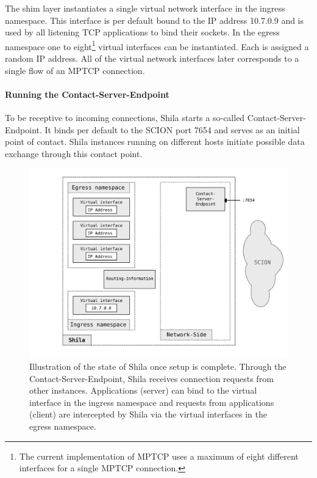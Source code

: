 The shim layer instantiates a single virtual network interface in the ingress namespace. This interface is per default bound to the IP address {\footnotesize 10.7.0.9} and is used by all listening TCP applications to bind their sockets. In the egress namespace one to eight\footnote{The current implementation of MPTCP uses a maximum of eight different interfaces for a single MPTCP connection.} virtual interfaces can be instantiated. Each is assigned a random IP address. All of the virtual network interfaces later corresponds to a single flow of an MPTCP connection.

\paragraph{Running the Contact-Server-Endpoint} To be receptive to incoming connections, Shila starts a so-called Contact-Server-Endpoint. It binds per default to the SCION port {\footnotesize 7654} and serves as an initial point of contact. Shila instances running on different hosts initiate possible data exchange through this contact point.

\begin{figure}
	\begin{center}
		\def\svgwidth{1\textwidth}
		\includegraphics[scale=0.2]{../illustrations/shilaIntroduction/StateAfterSetup.pdf}   
		\caption[Caption for the list of figures.]{Illustration of the state of Shila once setup is complete. Through the Contact-Server-Endpoint, Shila receives connection requests from other instances. Applications (server) can bind to the virtual interface in the ingress namespace and requests from applications (client) are intercepted by Shila via the virtual interfaces in the egress namespace.}
		\label{fig:ShilaIllustrationStateAfterSetup}
	\end{center}
\end{figure}

